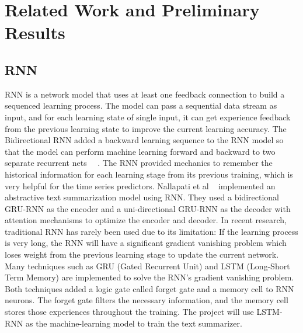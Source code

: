 \documentclass[conference]{IEEEtran}
\begin{document}
\section{Related Work and Preliminary Results}
\subsection{RNN}
RNN is a network model that uses at least one feedback connection to build a sequenced learning process. The model can pass a sequential data stream as input, and for each learning state of single input, it can get experience feedback from the previous learning state to improve the current learning accuracy. The Bidirectional RNN added a backward learning sequence to the RNN model so that the model can perform machine learning forward and backward to two separate recurrent nets~\cite{vu2016bi} ~\cite{schuster1997bidirectional}. The RNN provided mechanics to remember the historical information for each learning stage from its previous training, which is very helpful for the time series predictors. Nallapati et al ~\cite{nallapati2016Aug} implemented an abstractive text summarization model using RNN. They used a bidirectional GRU-RNN as the encoder and a uni-directional GRU-RNN as the decoder with attention mechanisms to optimize the encoder and decoder. In recent research, traditional RNN has rarely been used due to its limitation: If the learning process is very long, the RNN will have a significant gradient vanishing problem which loses weight from the previous learning stage to update the current network. Many techniques such as GRU (Gated Recurrent Unit) and LSTM (Long-Short Term Memory) are implemented to solve the RNN’s gradient vanishing problem. Both techniques added a logic gate called forget gate and a memory cell to RNN neurons. The forget gate filters the necessary information, and the memory cell stores those experiences throughout the training. The project will use LSTM-RNN as the machine-learning model to train the text summarizer.
\end{document}
